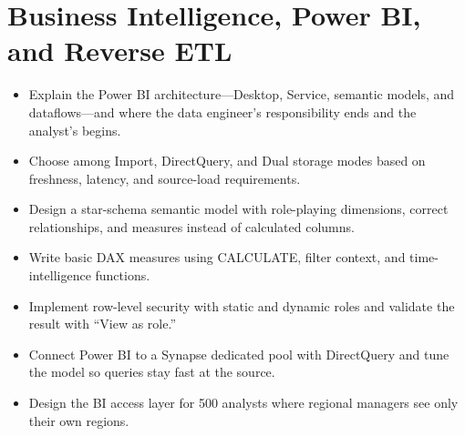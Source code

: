 \chapter{Business Intelligence, Power BI, and Reverse ETL}
%
\begin{objectives}
\begin{itemize}
    \item Explain the Power BI architecture---Desktop, Service, semantic models, and dataflows---and where the data engineer's responsibility ends and the analyst's begins.
    \item Choose among Import, DirectQuery, and Dual storage modes based on freshness, latency, and source-load requirements.
    \item Design a star-schema semantic model with role-playing dimensions, correct relationships, and measures instead of calculated columns.
    \item Write basic DAX measures using CALCULATE, filter context, and time-intelligence functions.
    \item Implement row-level security with static and dynamic roles and validate the result with ``View as role.''
    \item Connect Power BI to a Synapse dedicated pool with DirectQuery and tune the model so queries stay fast at the source.
    \item Design the BI access layer for 500 analysts where regional managers see only their own regions.
\end{itemize}
\end{objectives}

